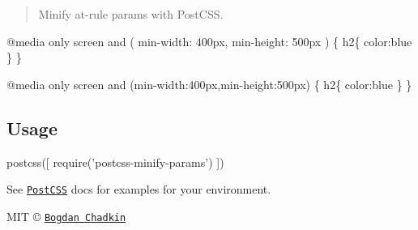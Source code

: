 \begin{quote}
Minify at-\/rule params with Post\+C\+SS. \end{quote}



\begin{DoxyCode}
@media only screen   and ( min-width: 400px, min-height: 500px ) \{
    h2\{
        color:blue
    \}
\}
\end{DoxyCode}



\begin{DoxyCode}
@media only screen and (min-width:400px,min-height:500px) \{
    h2\{
        color:blue
    \}
\}
\end{DoxyCode}


\subsection*{Usage}


\begin{DoxyCode}
postcss([ require('postcss-minify-params') ])
\end{DoxyCode}


See \href{https://github.com/postcss/postcss}{\tt Post\+C\+SS} docs for examples for your environment.

M\+IT © \href{mailto:trysound@yandex.ru}{\tt Bogdan Chadkin} 